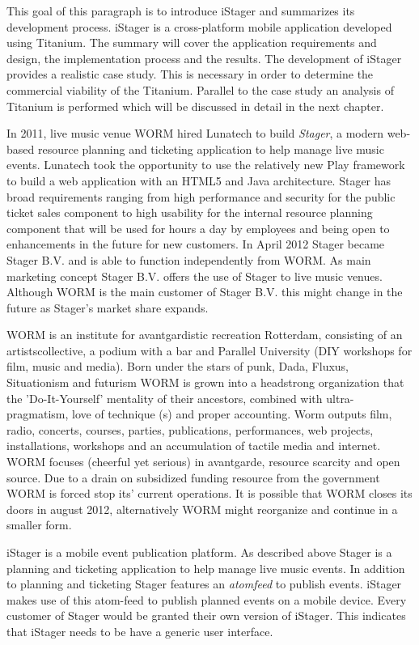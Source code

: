 This goal of this paragraph is to introduce iStager and summarizes its development process. iStager is a cross-platform mobile application developed using Titanium. The summary will cover the application requirements and design, the implementation process and the results. 
The development of iStager provides a realistic case study. This is necessary in order to determine the commercial viability of the Titanium. Parallel to the case study an analysis of Titanium is performed which will be discussed in detail in the next chapter.

In 2011, live music venue WORM hired Lunatech to build \emph{Stager}, a modern web-based resource planning and ticketing application to help manage live music events. Lunatech took the opportunity to use the relatively new Play framework to build a web application with an HTML5 and Java architecture. Stager has broad requirements ranging from high performance and security for the public ticket sales component to high usability for the internal resource planning component that will be used for hours a day by employees and being open to enhancements in the future for new customers.\cite{Hilton2012} In April 2012 Stager became Stager B.V. and is able to function independently from WORM. As main marketing concept Stager B.V. offers the use of Stager  to live music venues. Although WORM is the main customer of Stager B.V. this might change in the future as Stager's market share expands. 

WORM is an institute for avantgardistic recreation Rotterdam, consisting of an artistscollective, a podium with a bar and Parallel University (DIY workshops for film, music and media). Born under the stars of punk, Dada, Fluxus, Situationism and futurism WORM is grown into a headstrong organization that the 'Do-It-Yourself' mentality of their ancestors, combined with ultra-pragmatism, love of technique (s) and proper accounting. Worm outputs film, radio, concerts, courses, parties, publications, performances, web projects, installations, workshops and an accumulation of tactile media and internet. WORM focuses (cheerful yet serious) in avantgarde, resource scarcity and open source.\cite{WORM2012} Due to a drain on subsidized funding resource from the government WORM is forced stop its' current operations. It is possible that WORM closes its doors in august 2012, alternatively WORM might reorganize and continue in a smaller form.

iStager is a mobile event publication platform. As described above Stager is a planning and ticketing application to help manage live music events. In addition to planning and ticketing Stager features an \emph{atomfeed} to publish events. iStager makes use of this atom-feed to publish planned events on a mobile device. Every customer of Stager would be granted their own version of iStager. This indicates that iStager needs to be have a generic user interface.


